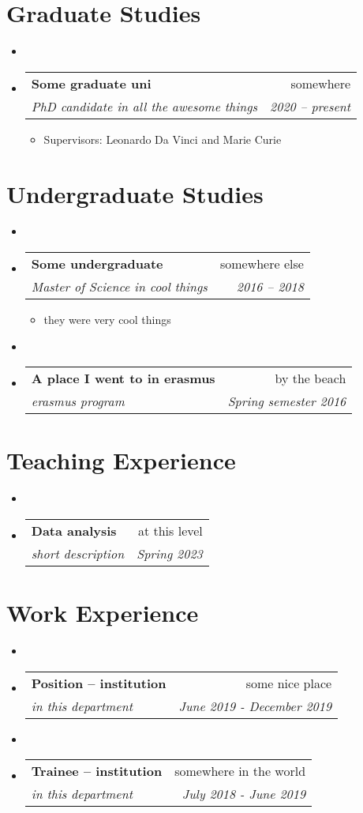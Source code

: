 \documentclass[letterpaper,11pt]{article}
\makeatletter
\newcommand{\sh}[4]{
  \vspace{-2pt}\item
    \begin{tabular*}{0.97\textwidth}[t]{l@{\extracolsep{\fill}}r}
      \textbf{#1} & #2 \\
      \textit{\small#3} & \textit{\small #4} \\
    \end{tabular*}\vspace{-7pt}
}
\makeatother
\begin{document}
\hypertarget{graduate-studies}{%
\section{Graduate Studies}\label{graduate-studies}}

\begin{itemize}
\item
 \sh{Some graduate uni}{somewhere}{PhD candidate in all the awesome things}{2020 – present}\begin{itemize}
\item Supervisors: Leonardo Da Vinci and Marie Curie
\end{itemize} \end{itemize}

\hypertarget{undergraduate-studies}{%
\section{Undergraduate Studies}\label{undergraduate-studies}}

\begin{itemize}
\item
 \sh{Some undergraduate}{somewhere else}{Master of Science in cool things}{2016 – 2018}\begin{itemize}
\item they were very cool things
\end{itemize}
\item
\sh{A place I went to in erasmus}{by the beach}{erasmus program}{Spring semester 2016}\empty \end{itemize}

\hypertarget{teaching-experience}{%
\section{Teaching Experience}\label{teaching-experience}}

\begin{itemize}
\item
 \sh{Data analysis}{at this level}{short description}{Spring 2023} \end{itemize}

\hypertarget{work-experience}{%
\section{Work Experience}\label{work-experience}}

\begin{itemize}
\item
 \sh{Position – institution}{some nice place}{in this department}{June 2019 - December 2019}
\item
\sh{Trainee – institution}{somewhere in the world}{in this department}{July 2018 - June 2019} \end{itemize}
\end{document}
